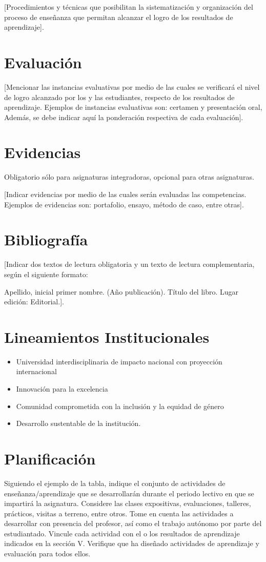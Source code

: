 \documentclass[11pt]{article}
\begin{document}
[Procedimientos y técnicas que posibilitan la sistematización y organización del proceso de enseñanza que permitan alcanzar el logro de los resultados de aprendizaje].

\section{Evaluación}
\label{sec:org8f5b5f0}
[Mencionar las instancias evaluativas por medio de las cuales se verificará el nivel de logro alcanzado por los y las estudiantes, respecto de los resultados de aprendizaje. Ejemplos de instancias evaluativas son: certamen y presentación oral, Además, se debe indicar aquí la ponderación respectiva de cada evaluación]. 

\section{Evidencias}
\label{sec:org19e46f8}
Obligatorio sólo para asignaturas integradoras, opcional para otras asignaturas.

[Indicar evidencias por medio de las cuales serán evaluadas las competencias. Ejemplos de evidencias son: portafolio, ensayo, método de caso, entre otras]. 

\section{Bibliografía}
\label{sec:org7b42fd5}
[Indicar dos textos de lectura obligatoria y un texto de lectura complementaria, según el siguiente formato:

Apellido, inicial primer nombre. (Año publicación). Título del libro. Lugar edición: Editorial.].

\section{Lineamientos Institucionales}
\label{sec:org9f37218}
\begin{itemize}
\item Universidad interdisciplinaria de impacto nacional con proyección internacional
\item Innovación para la excelencia
\item Comunidad comprometida con la inclusión y la equidad de género
\item Desarrollo sustentable de la institución.
\end{itemize}

\section{Planificación}
\label{sec:orgf855c48}
Siguiendo el ejemplo de la tabla, indique el conjunto de actividades de enseñanza/aprendizaje que se desarrollarán durante el periodo lectivo en que se impartirá la asignatura. Considere las clases expositivas, evaluaciones, talleres, prácticos, visitas a terreno, entre otros. Tome en cuenta las actividades a desarrollar con presencia del profesor, así como el trabajo autónomo por parte del estudiantado. Vincule cada actividad con el o los resultados de aprendizaje indicados en la sección V. Verifique que ha diseñado actividades de aprendizaje y evaluación para todos ellos.
\end{document}
